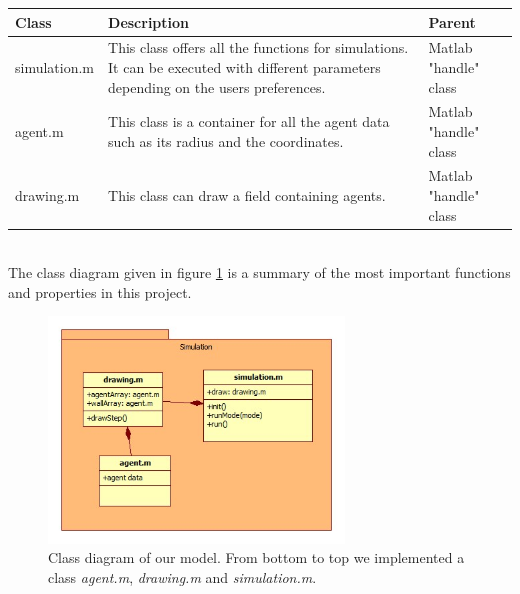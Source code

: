 \begin{tabular}{|l|p{7cm}|l|}
        \hline
        Class & Description & Parent \\ \hline
        simulation.m
		& This class offers all the functions for simulations. It can be executed  
		with different parameters depending on the users preferences.           
		& Matlab "handle" class \\ \hline

		agent.m    
		& This class is a container for all the agent data such as its radius and 
		the coordinates.   
		& Matlab "handle" class \\ \hline


		drawing.m
		& This class can draw a field containing agents.           
		& Matlab "handle" class \\  \hline

\end{tabular}\\
\noi The class diagram given in figure \ref{fig:classpackage} is a summary of the most important functions and properties in this project.\\
\begin{figure}[h!]
	\centering
		\includegraphics[width=0.70\textwidth]{pictures/classpackage}
	\caption{Class diagram of our model. From bottom to top we implemented a class \textit{agent.m}, \textit{drawing.m} and \textit{simulation.m}.}
	\label{fig:classpackage}
\end{figure}

